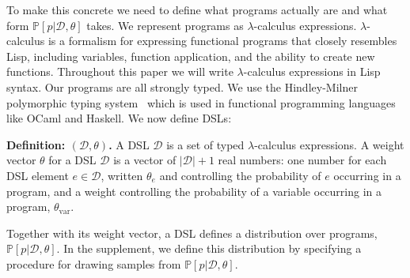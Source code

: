 \documentclass{article}
\newcommand{\code}[1]{{\footnotesize\texttt{#1}}}
\newcommand{\probability}{\mathds{P}} %
\begin{document}
To make this concrete we need to define what programs actually are and
what form $\probability[p |\mathcal{D},\theta]$ takes.
We represent programs as $\lambda$-calculus expressions.
$\lambda$-calculus is a formalism for expressing functional programs
that closely resembles Lisp,
including variables, function application, and the ability to create new functions.
Throughout this paper we will write $\lambda$-calculus expressions in Lisp syntax.
Our programs are all strongly typed.
We use the Hindley-Milner polymorphic typing system~\cite{pierce} which is
used in functional programming languages like OCaml and Haskell.
We now define DSLs:

\noindent\textbf{Definition: $(\mathcal{D},\theta)$.}
A DSL $\mathcal{D}$ is a set of typed $\lambda$-calculus expressions.
A weight vector $\theta$ for a DSL $\mathcal{D}$ is a vector of $|\mathcal{D}| + 1$ real numbers:
one number for each DSL element $e\in \mathcal{D}$, written $\theta_e$ and controlling the probability of  $e$ occurring in a program,
and a weight controlling the probability of a variable occurring in a program, $\theta_{\text{var}}$.

Together with its weight vector,
a DSL defines a distribution over programs, $\probability[p|\mathcal{D},\theta]$.
In the supplement, we define this distribution  
by specifying a procedure for drawing samples from $\probability[p|\mathcal{D},\theta]$. %
\end{document}
